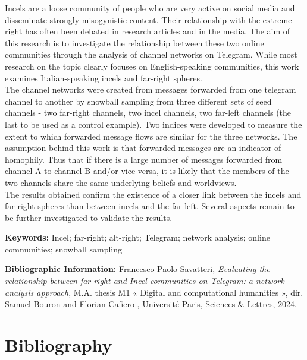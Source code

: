 \documentclass[a4paper,twoside,12pt, openany]{book}
\begin{document}
Incels are a loose community of people who are very active on social media and disseminate strongly misogynistic content. Their relationship with the extreme right has often been debated in research articles and in the media. The aim of this research is to investigate the relationship between these two online communities through the analysis of channel networks on Telegram. While most research on the topic clearly focuses on English-speaking communities, this work examines Italian-speaking incels and far-right spheres. \\

The channel networks were created from messages forwarded from one telegram channel to another by snowball sampling from three different sets of seed channels - two far-right channels, two incel channels, two far-left channels (the last to be used as a control example). Two indices were developed to measure the extent to which forwarded message flows are similar for the three networks. The assumption behind this work is that forwarded messages are an indicator of homophily. Thus that if there is a large number of messages forwarded from channel A to channel B and/or vice versa, it is likely that the members of the two channels share the same underlying beliefs and worldviews.\\

The results obtained confirm the existence of a closer link between the incels and far-right spheres than between incels and the far-left. Several aspects remain to be further investigated to validate the results.


\medskip

\textbf{Keywords:} Incel; far-right; alt-right; Telegram; network analysis; online communities; snowball sampling

\textbf{Bibliographic Information:} Francesco Paolo Savatteri, \textit{Evaluating the relationship between far-right and Incel communities on Telegram: a network analysis approach}, M.A. thesis M1 « Digital and computational humanities », dir. Samuel Bouron and Florian Cafiero , Université Paris, Sciences \& Lettres, 2024.


\clearpage
\thispagestyle{empty}
\cleardoublepage

\section*{Bibliography}
\printbibliography[heading=primary-source, keyword=primary-source]
\printbibliography[heading=secondary-source, keyword=secondary-source]
\end{document}
